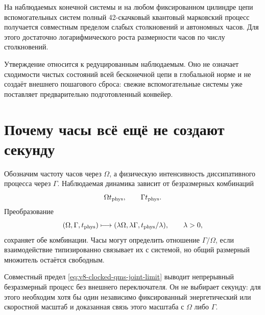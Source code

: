 \begin{theorem}
На наблюдаемых конечной системы и на любом фиксированном цилиндре цепи
вспомогательных систем полный 42-скачковый квантовый марковский процесс
получается совместным пределом слабых столкновений и автономных часов.
Для этого достаточно логарифмического роста размерности часов по числу
столкновений.
\end{theorem}

Утверждение относится к редуцированным наблюдаемым. Оно не означает
сходимости чистых состояний всей бесконечной цепи в глобальной норме и не
создаёт внешнего пошагового сброса: свежие вспомогательные системы уже
поставляет предварительно подготовленный конвейер.

\section{Почему часы всё ещё не создают секунду}

Обозначим частоту часов через $\Omega$, а физическую интенсивность
диссипативного процесса через $\Gamma$. Наблюдаемая динамика зависит от
безразмерных комбинаций
\begin{equation}
 \Omega t_{\rm phys},\qquad \Gamma t_{\rm phys}.
\end{equation}
Преобразование
\begin{equation}
 (\Omega,\Gamma,t_{\rm phys})\longmapsto
 (\lambda\Omega,\lambda\Gamma,t_{\rm phys}/\lambda),
 \qquad \lambda>0,
 \label{eq:v8-clocked-qms-common-scale-orbit}
\end{equation}
сохраняет обе комбинации. Часы могут определить отношение
$\Gamma/\Omega$, если взаимодействие типизированно связывает их с системой,
но общий размерный множитель остаётся свободным.

\begin{nogocriterion}
Совместный предел \eqref{eq:v8-clocked-qms-joint-limit} выводит непрерывный
безразмерный процесс без внешнего переключателя. Он не выбирает секунду:
для этого необходим хотя бы один независимо фиксированный энергетический
или скоростной масштаб и доказанная связь этого масштаба с $\Omega$ либо
$\Gamma$.
\end{nogocriterion}

